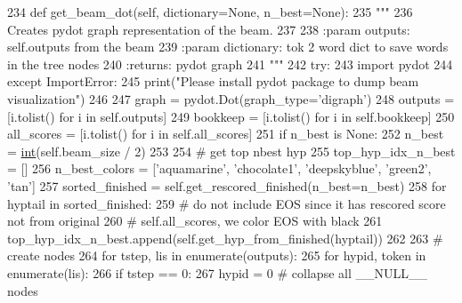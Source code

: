 \begin{DoxyCode}
234     \textcolor{keyword}{def }get\_beam\_dot(self, dictionary=None, n\_best=None):
235         \textcolor{stringliteral}{"""}
236 \textcolor{stringliteral}{        Creates pydot graph representation of the beam.}
237 \textcolor{stringliteral}{}
238 \textcolor{stringliteral}{        :param outputs: self.outputs from the beam}
239 \textcolor{stringliteral}{        :param dictionary: tok 2 word dict to save words in the tree nodes}
240 \textcolor{stringliteral}{        :returns: pydot graph}
241 \textcolor{stringliteral}{        """}
242         \textcolor{keywordflow}{try}:
243             \textcolor{keyword}{import} pydot
244         \textcolor{keywordflow}{except} ImportError:
245             print(\textcolor{stringliteral}{"Please install pydot package to dump beam visualization"})
246 
247         graph = pydot.Dot(graph\_type=\textcolor{stringliteral}{'digraph'})
248         outputs = [i.tolist() \textcolor{keywordflow}{for} i \textcolor{keywordflow}{in} self.outputs]
249         bookkeep = [i.tolist() \textcolor{keywordflow}{for} i \textcolor{keywordflow}{in} self.bookkeep]
250         all\_scores = [i.tolist() \textcolor{keywordflow}{for} i \textcolor{keywordflow}{in} self.all\_scores]
251         \textcolor{keywordflow}{if} n\_best \textcolor{keywordflow}{is} \textcolor{keywordtype}{None}:
252             n\_best = \hyperlink{namespacelanguage__model_1_1eval__ppl_a7d12ee00479673c5c8d1f6d01faa272a}{int}(self.beam\_size / 2)
253 
254         \textcolor{comment}{# get top nbest hyp}
255         top\_hyp\_idx\_n\_best = []
256         n\_best\_colors = [\textcolor{stringliteral}{'aquamarine'}, \textcolor{stringliteral}{'chocolate1'}, \textcolor{stringliteral}{'deepskyblue'}, \textcolor{stringliteral}{'green2'}, \textcolor{stringliteral}{'tan'}]
257         sorted\_finished = self.get\_rescored\_finished(n\_best=n\_best)
258         \textcolor{keywordflow}{for} hyptail \textcolor{keywordflow}{in} sorted\_finished:
259             \textcolor{comment}{# do not include EOS since it has rescored score not from original}
260             \textcolor{comment}{# self.all\_scores, we color EOS with black}
261             top\_hyp\_idx\_n\_best.append(self.get\_hyp\_from\_finished(hyptail))
262 
263         \textcolor{comment}{# create nodes}
264         \textcolor{keywordflow}{for} tstep, lis \textcolor{keywordflow}{in} enumerate(outputs):
265             \textcolor{keywordflow}{for} hypid, token \textcolor{keywordflow}{in} enumerate(lis):
266                 \textcolor{keywordflow}{if} tstep == 0:
267                     hypid = 0  \textcolor{comment}{# collapse all \_\_NULL\_\_ nodes}

\end{DoxyCode}
